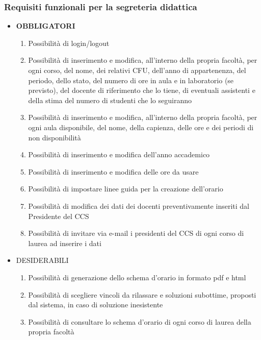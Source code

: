 \documentclass[11pt,a4paper]{article}
\begin{document}
\subsubsection{Requisiti funzionali per la segreteria didattica}
\begin{itemize}
\item \textbf{OBBLIGATORI}
\begin{enumerate}
\item Possibilità di login/logout
\item Possibilità di inserimento e modifica, all'interno della propria facoltà, per ogni corso, del nome, dei relativi CFU, dell'anno di appartenenza, del periodo, dello stato, del numero di ore in aula e in laboratorio (se previsto), del docente di riferimento che lo tiene, di eventuali assistenti e della stima del numero di studenti che lo seguiranno
\item Possibilità di inserimento e modifica, all'interno della propria facoltà, per ogni aula disponibile, del nome, della capienza, delle ore e dei periodi di non disponibilità
\item Possibilità di inserimento e modifica dell'anno accademico
\item Possibilità di inserimento e modifica delle ore da usare
\item Possibilità di impostare linee guida per la creazione dell'orario
\item Possibilità di modifica dei dati dei docenti preventivamente inseriti dal Presidente del CCS
\item Possibilità di invitare via e-mail i presidenti del CCS di ogni corso di laurea ad inserire i dati
\end{enumerate}
\item \textsc{DESIDERABILI}
\begin{enumerate}
\item Possibilità di generazione dello schema d'orario in formato pdf e html
\item Possibilità di scegliere vincoli da rilassare e soluzioni subottime, proposti dal sistema, in caso di soluzione inesistente
\item Possibilità di consultare lo schema d'orario di ogni corso di laurea della propria facoltà
\end{enumerate}
\end{itemize}
\end{document}
